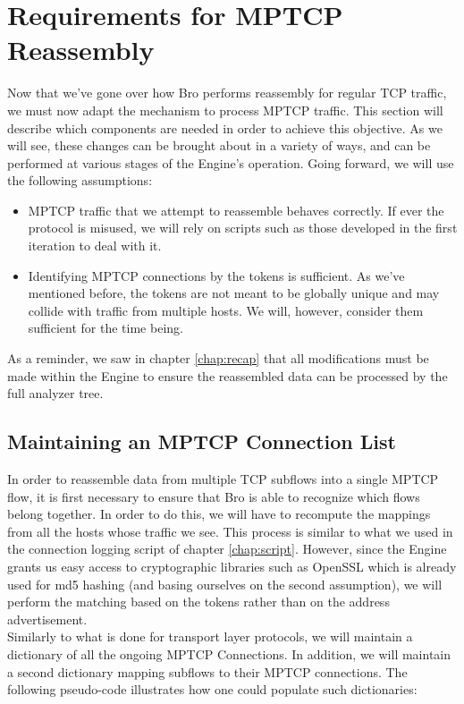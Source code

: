 
\chapter{Requirements for MPTCP Reassembly} \label{chap:reassembly}

Now that we've gone over how Bro performs reassembly for regular TCP traffic, we must now adapt the mechanism to process MPTCP traffic. This section will describe which components are needed in order to achieve this objective. As we will see, these changes can be brought about in a variety of ways, and can be performed at various stages of the Engine's operation. Going forward, we will use the following assumptions:
\begin{itemize}
\item MPTCP traffic that we attempt to reassemble behaves correctly. If ever the protocol is misused, we will rely on scripts such as those developed in the first iteration to deal with it.
\item Identifying MPTCP connections by the tokens is sufficient. As we've mentioned before, the tokens are not meant to be globally unique and may collide with traffic from multiple hosts. We will, however, consider them sufficient for the time being.
\end{itemize}

As a reminder, we saw in chapter \ref{chap:recap} that all modifications must be made within the Engine to ensure the reassembled data can be processed by the full analyzer tree.

\section{Maintaining an MPTCP Connection List}
In order to reassemble data from multiple TCP subflows into a single MPTCP flow, it is first necessary to ensure that Bro is able to recognize which flows belong together. In order to do this, we will have to recompute the mappings from all the hosts whose traffic we see. This process is similar to what we used in the connection logging script of chapter \ref{chap:script}. However, since the Engine grants us easy access to cryptographic libraries such as OpenSSL \cite{openssl} which is already used for md5 hashing (and basing ourselves on the second assumption), we will perform the matching based on the tokens rather than on the address advertisement.\\

Similarly to what is done for transport layer protocols, we will maintain a dictionary of all the ongoing MPTCP Connections. In addition, we will maintain a second dictionary mapping subflows to their MPTCP connections. The following pseudo-code illustrates how one could populate such dictionaries:

